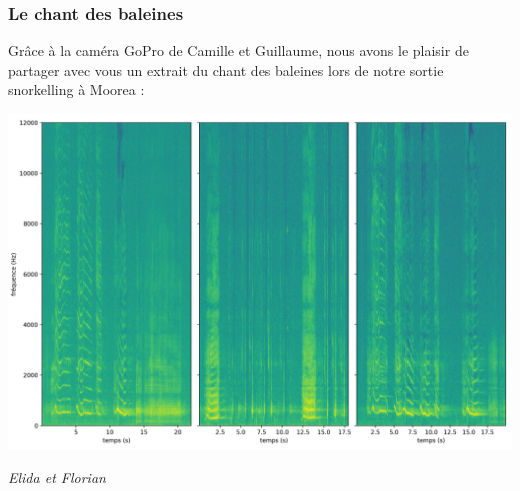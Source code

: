 \hypertarget{le-chant-des-baleines}{%
\subsubsection{Le chant des baleines}\label{le-chant-des-baleines}}

Grâce à la caméra GoPro de Camille et Guillaume, nous avons le plaisir
de partager avec vous un extrait du chant des baleines lors de notre
sortie snorkelling à Moorea :

\includegraphics{spectrogram/baleines.png}

\emph{Elida et Florian}
